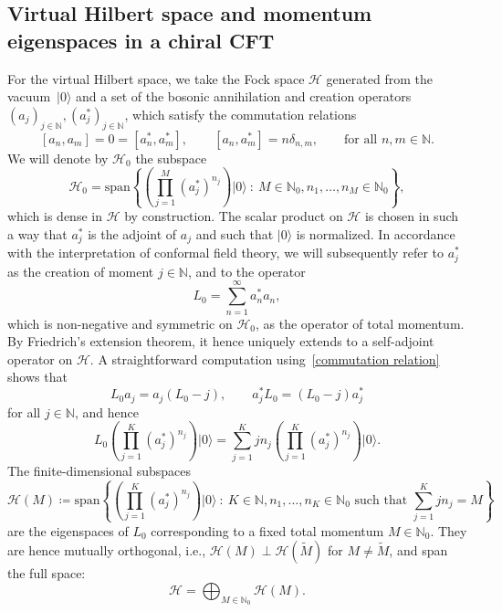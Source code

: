 \documentclass[letterpaper, DIV=17]{scrartcl}
\numberwithin{equation}{section}
\theoremstyle{definition}
\begin{document}
	\subsection{Virtual Hilbert space and momentum eigenspaces in a chiral CFT}
	  For the virtual Hilbert space, we take  the Fock space $\mathcal{H}$ generated from the vacuum~$ \vert 0 \rangle$ and a set of the bosonic annihilation and creation operators $(a_j)_{j\in \mathbb{N}}, (a_j^*)_{j\in \mathbb{N}}$, which satisfy the commutation relations
		\begin{equation} \label{commutation relation}
				[a_n, a_m] =0 = [a_n^*, a_m^*], \qquad [a_n, a_m^*] = n \delta_{n,m}, \qquad \text{for all } n,m \in \mathbb{N}.
		\end{equation}
		We will denote by $\mathcal{H}_0$ the subspace
		\begin{equation}
			\mathcal{H}_0 = \text{span} \left\{ \left(\prod_{j=1}^M (a_j^*)^{n_j} \right) \vert 0 \rangle \ : \ M\in \mathbb{N}_0, n_1, \dots, n_M\in \mathbb{N}_0 \right\}, 
		\end{equation}
		which is dense in $\mathcal{H}$ by construction.  
		The scalar product on $\mathcal{H}$ is chosen in such a way that $a_j^*$ is the adjoint of $a_j$ and such that $\vert 0\rangle$ is normalized. In accordance with the interpretation of conformal field theory, we will subsequently refer to  $a_j^*$ as the creation of moment $ j \in \mathbb{N} $, and to the operator 
		\begin{equation}\label{def:L0}
			L_0 = \sum_{n=1}^\infty a_n^* a_n , 
		\end{equation}
		which is  non-negative and symmetric on $\mathcal{H}_0$, 
		as the operator of total momentum. By Friedrich's extension theorem, it hence uniquely extends to a self-adjoint operator on $ \mathcal{H} $. 
		A straightforward computation using~\eqref{commutation relation} shows that 
		\begin{equation} \label{commutation relation L0 aj}
				L_0 a_j = a_j (L_0-j), \qquad a_j^* L_0 = (L_0-j) a_j^*
			\end{equation}
		for all $ j \in \mathbb{N} $, and hence
		\begin{equation}\label{eq:L_0evs}
		 L_0\left(\prod_{j=1}^K (a_j^*)^{n_j} \right) \vert 0 \rangle = \sum_{j=1}^K j n_j  \left(\prod_{j=1}^K (a_j^*)^{n_j} \right) \vert 0 \rangle .
		\end{equation}
		The finite-dimensional subspaces 
		 \begin{equation}\label{def:momentumH}
				\mathcal{H}(M) \coloneqq \mathrm{span} \left\{ \left(\prod_{j=1}^K (a_j^*)^{n_j}\right) \vert 0 \rangle \ : \ K\in \mathbb{N}, n_1, \dots, n_K\in \mathbb{N}_0 \text{ such that } \sum_{j=1}^K j n_j =M \right\}
			\end{equation}
			are the eigenspaces of $ L_0 $ corresponding to 
			 a fixed total momentum $ M \in \mathbb{N}_0 $. They are hence mutually orthogonal, i.e.,  $\mathcal{H}(M)\perp \mathcal{H}(\tilde{M}) $ for $   M\neq \tilde{M}  $, and span the full space:
			\begin{equation}\label{eq:orthsum}
			  \mathcal{H} = \bigoplus_{M\in \mathbb{N}_0}  \mathcal{H}(M) . 
			\end{equation}
\end{document}
